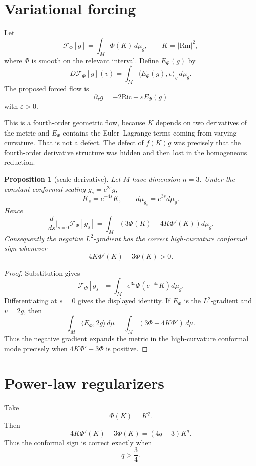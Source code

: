 \documentclass[11pt]{amsart}
\newtheorem{proposition}{Proposition}
\newcommand{\Rm}{\mathrm{Rm}}
\newcommand{\Ric}{\mathrm{Ric}}
\newcommand{\dmu}{\,d\mu_g}
\newcommand{\dt}{\partial_\tau}
\newcommand{\F}{\mathcal F}
\begin{document}
\section{Variational forcing}

Let
\[
        \F_\Phi[g]=\int_M \Phi(K)\dmu,
        \qquad K=|\Rm|^2,
\]
where \(\Phi\) is smooth on the relevant interval.  Define \(E_\Phi(g)\) by
\[
        D\F_\Phi[g](v)
        =
        \int_M \langle E_\Phi(g),v\rangle_g\,d\mu_g .
\]
The proposed forced flow is
\[
        \boxed{\dt g=-2\Ric-\varepsilon E_\Phi(g)}
\]
with \(\varepsilon>0\).

This is a fourth-order geometric flow, because \(K\) depends on two
derivatives of the metric and \(E_\Phi\) contains the Euler--Lagrange terms
coming from varying curvature.  That is not a defect.  The defect of
\(f(K)g\) was precisely that the fourth-order derivative structure was hidden
and then lost in the homogeneous reduction.

\begin{proposition}[scale derivative]
Let \(M\) have dimension \(n=3\).  Under the constant conformal scaling
\(g_s=e^{2s}g\),
\[
        K_s=e^{-4s}K,
        \qquad
        d\mu_{g_s}=e^{3s}d\mu_g .
\]
Hence
\[
        \frac{d}{ds}\bigg|_{s=0}\F_\Phi[g_s]
        =
        \int_M\left(3\Phi(K)-4K\Phi'(K)\right)d\mu_g .
\]
Consequently the negative \(L^2\)-gradient has the correct high-curvature
conformal sign whenever
\[
        4K\Phi'(K)-3\Phi(K)>0.
\]
\end{proposition}

\begin{proof}
Substitution gives
\[
        \F_\Phi[g_s]
        =
        \int_M e^{3s}\Phi(e^{-4s}K)d\mu_g .
\]
Differentiating at \(s=0\) gives the displayed identity.  If \(E_\Phi\) is the
\(L^2\)-gradient and \(v=2g\), then
\[
        \int_M \langle E_\Phi,2g\rangle\,d\mu
        =
        \int_M(3\Phi-4K\Phi')\,d\mu .
\]
Thus the negative gradient expands the metric in the high-curvature conformal
mode precisely when \(4K\Phi'-3\Phi\) is positive.
\end{proof}

\section{Power-law regularizers}

Take
\[
        \Phi(K)=K^q .
\]
Then
\[
        4K\Phi'(K)-3\Phi(K)
        =
        (4q-3)K^q .
\]
Thus the conformal sign is correct exactly when
\[
        q>\frac34 .
\]
\end{document}
